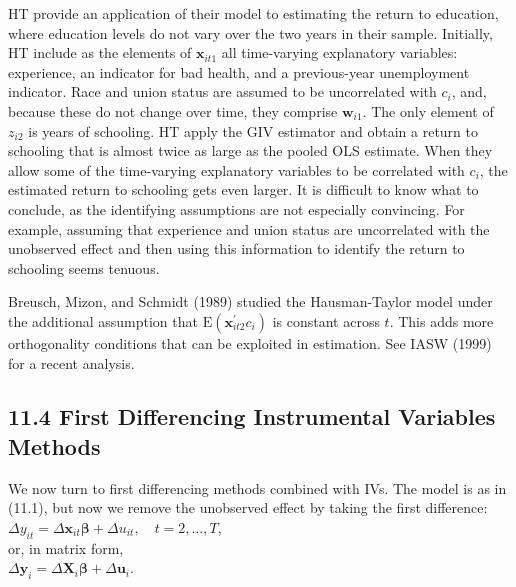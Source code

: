 \documentclass[10pt]{article}
\begin{document}
HT provide an application of their model to estimating the return to education, where education levels do not vary over the two years in their sample. Initially, HT include as the elements of $\mathbf{x}_{i t 1}$ all time-varying explanatory variables: experience, an indicator for bad health, and a previous-year unemployment indicator. Race and union status are assumed to be uncorrelated with $c_{i}$, and, because these do not change over time, they comprise $\mathbf{w}_{i 1}$. The only element of $z_{i 2}$ is years of schooling. HT apply the GIV estimator and obtain a return to schooling that is almost twice as large as the pooled OLS estimate. When they allow some of the time-varying explanatory variables to be correlated with $c_{i}$, the estimated return to schooling gets even larger. It is difficult to know what to conclude, as the identifying assumptions are not especially convincing. For example, assuming that experience and union status are uncorrelated with the unobserved effect and then using this information to identify the return to schooling seems tenuous.

Breusch, Mizon, and Schmidt (1989) studied the Hausman-Taylor model under the additional assumption that $\mathrm{E}\left(\mathbf{x}_{i t 2}^{\prime} c_{i}\right)$ is constant across $t$. This adds more orthogonality conditions that can be exploited in estimation. See IASW (1999) for a recent analysis.

\subsection*{11.4 First Differencing Instrumental Variables Methods}
We now turn to first differencing methods combined with IVs. The model is as in (11.1), but now we remove the unobserved effect by taking the first difference:\\
$\Delta y_{i t}=\Delta \mathbf{x}_{i t} \boldsymbol{\beta}+\Delta u_{i t}, \quad t=2, \ldots, T$,\\
or, in matrix form,\\
$\Delta \mathbf{y}_{i}=\Delta \mathbf{X}_{i} \boldsymbol{\beta}+\Delta \mathbf{u}_{i}$.
\end{document}
